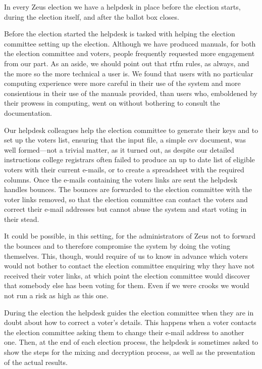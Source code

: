 \documentclass[letterpaper,10pt]{article}
\begin{document}
In every Zeus election we have a helpdesk in place before the election
starts, during the election itself, and after the ballot box closes.

Before the election started the helpdesk is tasked with helping the
election committee setting up the election. Although we have produced
manuals, for both the election committee and voters, people frequently
requested more engagement from our part. As an aside, we should point
out that {\sc rtfm} rules, as always, and the more so the more
technical a user is. We found that users with no particular computing
experience were more careful in their use of the system and more
consientious in their use of the manuals provided, than users who,
emboldened by their prowess in computing, went on without bothering to
consult the documentation.

Our helpdesk colleagues help the election committee to generate
their keys and to set up the voters list, ensuring that the input
file, a simple {\sc csv} document, was well formed---not a trivial
matter, as it turned out, as despite our detailed instructions college
registrars often failed to produce an up to date list of eligible
voters with their current e-mails, or to create a spreadsheet with the
required columns. Once the e-mails containing the
voters links are sent the helpdesk handles bounces. The bounces
are forwarded to the election committee with the voter links removed,
so that the election committee can contact the voters and correct
their e-mail addresses but cannot abuse the system and start voting in
their stead. 

It could be possible, in this setting, for the administrators of Zeus
not to forward the bounces and to therefore compromise the system by
doing the voting themselves. This, though, would require of us to know
in advance which voters would not bother to contact the election
committee enquiring why they have not received their voter links, at
which point the election committee would discover that somebody else
has been voting for them. Even if we were crooks we would not run a
risk as high as this one.

During the election the helpdesk guides the election committee when
they are in doubt about how to correct a voter's details. This happens
when a voter contacts the election committee asking them to change
their e-mail address to another one. Then, at the end of each election
process, the helpdesk is sometimes asked to show the steps for the
mixing and decryption process, as well as the presentation of the
actual results.
\end{document}
